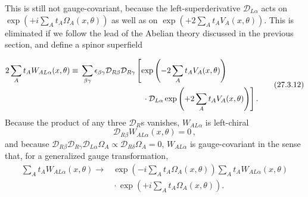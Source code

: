 \begin{sloppypar}
This is still not gauge-covariant, because the left-superderivative
\(\mathcal{D}_{L\alpha}\) acts on
\(\exp(+i\sum_A t_A\Omega_A(x,\theta))\) as well as on
\(\exp(+2\sum_A t_A V_A(x,\theta))\). This is eliminated if we follow
the lead of the Abelian theory discussed in the previous section, and
define a spinor superfield
\end{sloppypar}
\begin{equation}
  \begin{aligned}
  2\sum_A t_AW_{AL\alpha}(x,\theta)
  \equiv{}&
  \sum_{\beta\gamma}\epsilon_{\beta\gamma}
  \mathcal{D}_{R\beta}\mathcal{D}_{R\gamma}
  \left[
    \exp\left(-2\sum_A t_AV_A(x,\theta)\right)
  \right.
  \\
  &\left.\hspace{27mm}{}
    \cdot\mathcal{D}_{L\alpha}
    \exp\left(+2\sum_A t_AV_A(x,\theta)\right)
  \right].
  \end{aligned}
  \tag{27.3.12}\label{eq:27.3.12}
\end{equation}
Because the product of any three \(\mathcal{D}_R\)s vanishes,
\(W_{AL\alpha}\) is left-chiral
\begin{equation}
  \mathcal{D}_{R\beta}W_{AL\alpha}(x,\theta)=0\,,
  \tag{27.3.13}\label{eq:27.3.13}
\end{equation}
and because
\(\mathcal{D}_{R\beta}\mathcal{D}_{R\gamma}
\mathcal{D}_{L\alpha}\Omega_A
\propto\mathcal{D}_{R\delta}\Omega_A=0\),
\(W_{AL\alpha}\) is gauge-covariant in the sense that, for a generalized
gauge transformation,
\begin{equation}
  \begin{aligned}
  \sum_A t_AW_{AL\alpha}(x,\theta)
  \longrightarrow{}&
  \exp\left(-i\sum_A t_A\Omega_A(x,\theta)\right)
  \sum_A t_AW_{AL\alpha}(x,\theta)
  \\
  &{}\cdot
  \exp\left(+i\sum_A t_A\Omega_A(x,\theta)\right).
  \end{aligned}
  \tag{27.3.14}\label{eq:27.3.14}
\end{equation}

